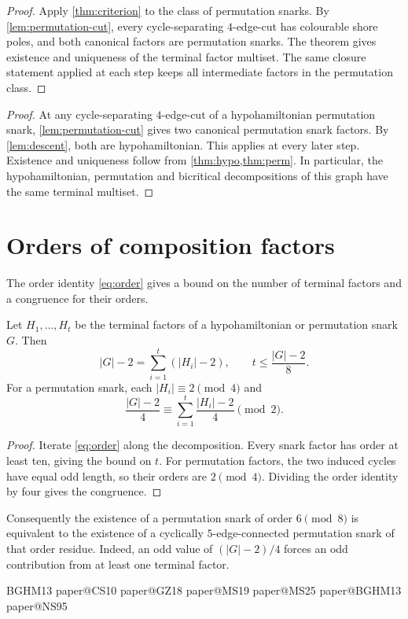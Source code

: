 \documentclass[justified,notoc,twoside,nobib,nofonts]{tufte-handout}
\makeatletter
\newcommand{\paperreference}[1]{\csname paper@#1\endcsname}
\makeatother
\begin{document}
\permfactorisation*
\begin{proof}
Apply \cref{thm:criterion} to the class of permutation snarks.
By \cref{lem:permutation-cut}, every cycle-separating $4$-edge-cut
has colourable shore poles, and both canonical factors are
permutation snarks. The theorem gives existence and uniqueness
of the terminal factor multiset. The same closure statement
applied at each step keeps all intermediate factors in the
permutation class.
\end{proof}

\intersectionfactorisation*
\begin{proof}
At any cycle-separating $4$-edge-cut of a hypohamiltonian permutation
snark, \cref{lem:permutation-cut} gives two canonical permutation
snark factors. By \cref{lem:descent}, both are hypohamiltonian.
This applies at every later step. Existence and uniqueness follow
from \cref{thm:hypo,thm:perm}. In particular, the hypohamiltonian,
permutation and bicritical decompositions of this graph have the
same terminal multiset.
\end{proof}

\section{Orders of composition factors}

The order identity \eqref{eq:order} gives a bound on the number of
terminal factors and a congruence for their orders.

\begin{corollary}\label{cor:orders}
Let $H_1,\ldots,H_t$ be the terminal factors of a hypohamiltonian
or permutation snark $G$. Then
\[
 |G|-2=\sum_{i=1}^{t}(|H_i|-2),
 \qquad t\le\frac{|G|-2}{8}.
\]
For a permutation snark, each $|H_i|\equiv2\pmod4$ and
\[
 \frac{|G|-2}{4}\equiv
   \sum_{i=1}^{t}\frac{|H_i|-2}{4}\pmod2.
\]
\end{corollary}
\begin{proof}
Iterate \eqref{eq:order} along the decomposition. Every snark factor
has order at least ten, giving the bound on $t$.
For permutation factors, the two induced cycles have equal odd
length, so their orders are $2\pmod4$. Dividing the order identity
by four gives the congruence.
\end{proof}

Consequently the existence of a permutation snark of order
$6\pmod8$ is equivalent to the existence of a cyclically
$5$-edge-connected permutation snark of that order residue.
Indeed, an odd value of $(|G|-2)/4$ forces an odd contribution from
at least one terminal factor.

\begingroup
\fontsize{10}{12}\selectfont
\setlength{\bibsep}{5pt}
\begin{thebibliography}{BGHM13}
\paperreference{CS10}
\paperreference{GZ18}
\paperreference{MS19}
\paperreference{MS25}
\paperreference{BGHM13}
\paperreference{NS95}
\end{thebibliography}
\endgroup
\end{document}
